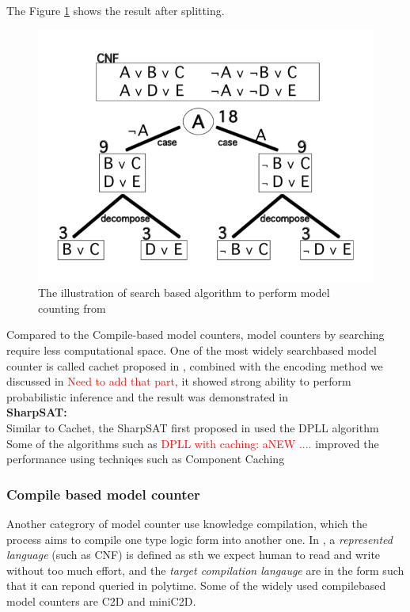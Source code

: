     The Figure \ref{fig:searchfig} shows the result after splitting.
    
    \begin{figure}
        \centering
        \includegraphics[width = 0.5 \textwidth]{pic/searchalgo.png}
        \caption{The illustration of search based algorithm to perform model counting from \cite{2008-literature-review}}
        \label{fig:searchfig}
    \end{figure}
    
    Compared to the Compile-based model counters, model counters by searching require less computational space. One of the most widely search\-based model counter is called cachet proposed in \cite{Cachet}, combined with the encoding method we discussed in \textcolor{red}{Need to add that part}, it showed strong ability to perform probabilistic inference and the result was demonstrated in \cite{Sang:2005:PBI:1619332.1619409}\\
    
    \textbf{SharpSAT:}\\
    Similar to Cachet, the SharpSAT first proposed in \cite{Sharp-SAT2006} used the DPLL algorithm \\
    Some of the algorithms such as \textcolor{red}{DPLL with caching: aNEW ....} improved the performance using techniqes such as Component Caching
    \subsubsection{Compile based model counter}
    Another categrory of model counter use knowledge compilation, which the process aims to compile one type logic form into another one.\cite{2008-literature-review} In \cite{2002language-map}, a \textit{represented language} (such as CNF) is defined as sth we expect human to read and write without too much effort, and the \textit{target compilation langauge} are in the form such that it can repond queried in poly\-time. Some of the widely used compile\-based model counters are C2D and miniC2D.\\
    
